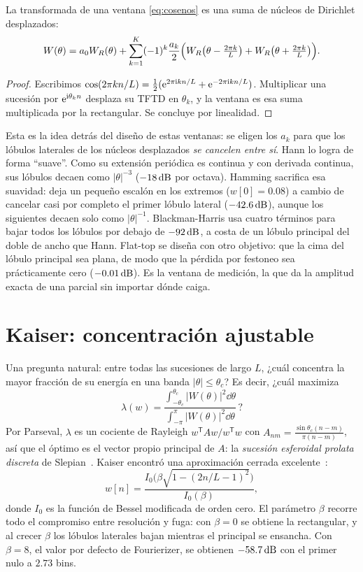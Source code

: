 \begin{proposicion}\label{prop:suma-dirichlet}
La transformada de una ventana \eqref{eq:cosenos} es una suma de núcleos de Dirichlet desplazados:
\[
  W(\theta)=a_0W_R(\theta)+\sum_{k=1}^{K}(-1)^k\frac{a_k}{2}\Bigl(W_R\bigl(\theta-\tfrac{2\pi k}{L}\bigr)+W_R\bigl(\theta+\tfrac{2\pi k}{L}\bigr)\Bigr).
\]
\end{proposicion}

\begin{proof}
Escribimos $\cos(2\pi kn/L)=\tfrac12(\mathrm{e}^{2\pi\mathrm{i} kn/L}+\mathrm{e}^{-2\pi\mathrm{i} kn/L})$. Multiplicar una sucesión
por $\mathrm{e}^{\mathrm{i}\theta_k n}$ desplaza su TFTD en $\theta_k$, y la ventana es esa suma multiplicada por la
rectangular. Se concluye por linealidad.
\end{proof}

Esta es la idea detrás del diseño de estas ventanas: se eligen los $a_k$ para que los lóbulos
laterales de los núcleos desplazados \emph{se cancelen entre sí}. Hann lo logra de forma ``suave''.
Como su extensión periódica es continua y con derivada continua, sus lóbulos decaen como
$|\theta|^{-3}$ ($-18\,\mathrm{dB}$ por octava). Hamming sacrifica esa suavidad: deja un pequeño escalón en
los extremos ($w[0]=0.08$) a cambio de cancelar casi por completo el primer lóbulo lateral
($-42.6\,\mathrm{dB}$), aunque los siguientes decaen solo como $|\theta|^{-1}$. Blackman-Harris usa cuatro
términos para bajar todos los lóbulos por debajo de $-92\,\mathrm{dB}$, a costa de un lóbulo principal del
doble de ancho que Hann. Flat-top se diseña con otro objetivo: que la cima del lóbulo principal
sea plana, de modo que la pérdida por festoneo sea prácticamente cero ($-0.01\,\mathrm{dB}$). Es la ventana
de medición, la que da la amplitud exacta de una parcial sin importar dónde caiga.

\section{Kaiser: concentración ajustable}

Una pregunta natural: entre todas las sucesiones de largo $L$, ¿cuál concentra la mayor fracción
de su energía en una banda $|\theta|\le\theta_c$? Es decir, ¿cuál maximiza
\[
  \lambda(w)=\frac{\int_{-\theta_c}^{\theta_c}|W(\theta)|^2\dd\theta}{\int_{-\pi}^{\pi}|W(\theta)|^2\dd\theta}\,?
\]
Por Parseval, $\lambda$ es un cociente de Rayleigh $w^{\mathsf T}Aw/w^{\mathsf T}w$ con
$A_{nm}=\frac{\sin\theta_c(n-m)}{\pi(n-m)}$, así que el óptimo es el vector propio principal de $A$:
la \emph{sucesión esferoidal prolata discreta} de Slepian~\cite{slepian1978}. Kaiser encontró una
aproximación cerrada excelente~\cite{kaiser1974}:
\[
  w[n]=\frac{I_0\!\bigl(\beta\sqrt{1-(2n/L-1)^2}\bigr)}{I_0(\beta)},
\]
donde $I_0$ es la función de Bessel modificada de orden cero. El parámetro $\beta$ recorre todo el
compromiso entre resolución y fuga: con $\beta=0$ se obtiene la rectangular, y al crecer $\beta$
los lóbulos laterales bajan mientras el principal se ensancha. Con $\beta=8$, el valor por defecto
de Fourierizer, se obtienen $-58.7\,\mathrm{dB}$ con el primer nulo a $2.73$ bins.

